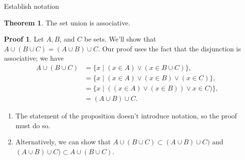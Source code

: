 \documentclass[fleqn]{beamer}
\theoremstyle{definition}
\newtheorem{myth}{Theorem}
\newtheorem{myproof}{Proof}
\newenvironment{checklist}{
  \begin{enumerate}[\ding{51}]
    \addtolength{\itemsep}{-0.0\itemsep}}
  {\end{enumerate}}
\begin{document}
\begin{frame}{Establish notation}

\begin{myth} The set union is associative. \end{myth}

\begin{myproof}  Let \(A,B\), and \(C\) be sets.  We'll show that \(A \cup (B \cup C) = (A \cup B) \cup C\).   Our proof uses the fact that
the disjunction is associative; we have
\begin{align*}
A \cup (B \cup C) &= \{x \mid (x \in A) \lor (x \in B \cup C) \}, \\
                                &= \{x \mid (x \in A) \lor (x \in B)  \lor  (x \in  C) \}, \\
                                            &= \{x \mid   ((x \in A) \lor  (x \in B))   \lor x \in C) \}, \\
                                &= (A \cup B) \cup C.
 \end{align*}
  \end{myproof}
  
  \begin{checklist}
  
  \item The statement of the proposition doesn't introduce notation, so the proof must do so.
  
  \item Alternatively, we can show that   \(  A \cup (B \cup C)  \subset  (A \cup B) \cup C) \) and  \( (A \cup B) \cup C) \subset A \cup (B \cup C)\).
  
  \end{checklist}

\end{frame}
\end{document}
